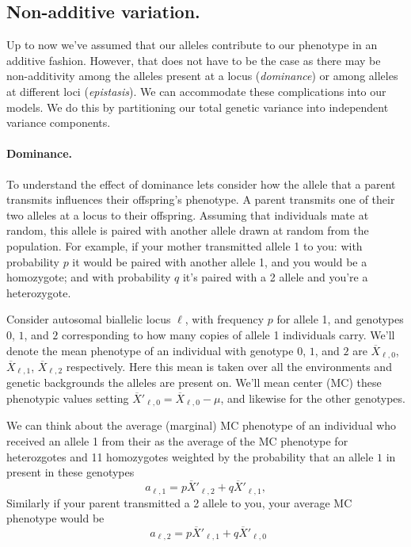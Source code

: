 \subsection{Non-additive variation.}

Up to now we've assumed that our alleles contribute to our phenotype in an
additive fashion. However, that does not have to be the case as there may be
non-additivity among the alleles present at a locus (\emph{dominance}) or among
alleles at different loci (\emph{epistasis}). We can accommodate these complications
into our models. We do this by partitioning our total genetic variance into
independent variance components.





\paragraph{Dominance.} To understand the effect of dominance lets consider how the allele
that a parent transmits influences their offspring's
phenotype. A parent transmits one of their two alleles at a locus to their offspring. 
Assuming that individuals mate at random, this allele is paired with another allele drawn at random from the population.
For example, if your mother transmitted allele 1 to you: with probability $p$ it would be paired with another allele 1, and you would be a homozygote; and with probability $q$ it's paired with a 2 allele and you're a heterozygote.


Consider autosomal biallelic locus $\ell$, with frequency $p$ for allele 1, and
genotypes $0$, $1$, and $2$ corresponding to how many copies of allele
1 individuals carry. We'll denote the mean phenotype of an individual
with genotype $0$, $1$, and $2$ are $\overline{X}_{\ell,0}$,
$\overline{X}_{\ell,1}$, $\overline{X}_{\ell,2}$ respectively. Here this mean is
taken over all the environments and genetic backgrounds the alleles
are present on. We'll mean center (MC)
these phenotypic values setting $\overline{X}'_{\ell,0} = \overline{X}_{\ell,0} - \mu$, and
likewise for the other genotypes. 

We can think about the average
(marginal) MC
phenotype of an individual who received an allele 1 from their as the average of the MC phenotype
for heterozgotes and 11 homozygotes weighted by the probability that
an allele $1$ in present in these genotypes
\begin{equation} 
  a_{\ell, 1} = p\overline{X}'_{\ell,2}  + q\overline{X}'_{\ell,1},
\end{equation}
Similarly if your parent transmitted a 2 allele to you, your average
MC phenotype would be
\begin{equation}
  ~~ a_{\ell, 2} = p\overline{X}'_{\ell,1}  + q\overline{X}'_{\ell,0} 
\end{equation}

